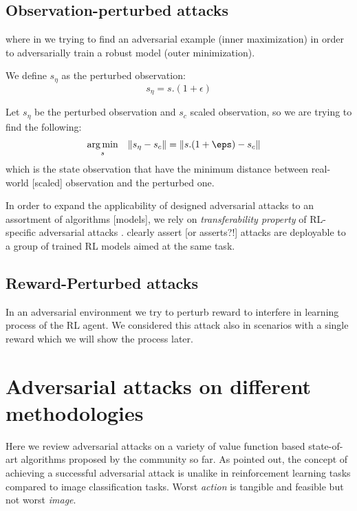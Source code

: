 \documentclass[letterpaper,12pt]{article}
\DeclareMathOperator*{\argmin}{arg\,min}
\newcommand{\norm}[1]{\left\lVert#1\right\rVert}
\begin{document}
\subsection{Observation-perturbed attacks}


where in we trying to find an adversarial example (inner maximization) in order to adversarially train a robust model (outer minimization).

We define $s_\eta$ as the perturbed observation:
\begin{equation}
    s_\eta = s . (1 + \epsilon) 
\end{equation}


Let $s_\eta$ be the perturbed observation and $s_c$ scaled observation, so we are trying to find the following:
\begin{equation}
\begin{aligned}
& \underset{s}{\argmin}
& & {\norm{s_\eta - s_c}} = \norm{s . (1 + \eps) - s_c}
\end{aligned}
\end{equation}
which is the state observation that have the minimum distance between real-world [scaled] observation and the perturbed one.

In order to expand the applicability of designed adversarial attacks to an assortment of algorithms [models], we rely on \textit{transferability property} of RL-specific adversarial attacks \cite{Szegedy2014, Papernot2016, Goodfellow2014a}. \citet{Huang2017} clearly assert [or asserts?!] attacks are deployable to a group of trained RL models aimed at the same task.  

\subsection{Reward-Perturbed attacks}
In an adversarial environment we try to perturb reward to interfere in learning process of the RL agent. We considered this attack also in scenarios with a single reward which we will show the process later.

\section{Adversarial attacks on different methodologies}
Here we review adversarial attacks on a variety of value function based state-of-art algorithms proposed by the community so far. As \citet{Pattanaik2018} pointed out, the concept of achieving a successful adversarial attack is unalike in reinforcement learning tasks compared to image classification tasks. Worst \textit{action} is tangible and feasible but not worst \textit{image}.
\end{document}

